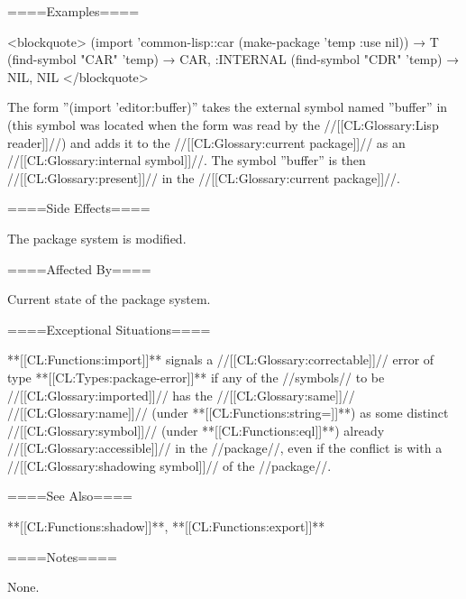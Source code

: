 ====Examples====

<blockquote> (import 'common-lisp::car (make-package 'temp :use nil)) → T (find-symbol "CAR" 'temp) → CAR, :INTERNAL (find-symbol "CDR" 'temp) → NIL, NIL </blockquote>

The form ''(import 'editor:buffer)'' takes the external symbol named ''buffer'' in  (this symbol was located when the form was read by the //[[CL:Glossary:Lisp reader]]//) and adds it to the //[[CL:Glossary:current package]]// as an //[[CL:Glossary:internal symbol]]//. The symbol ''buffer'' is then //[[CL:Glossary:present]]// in the //[[CL:Glossary:current package]]//.

====Side Effects====

The package system is modified.

====Affected By====

Current state of the package system.

====Exceptional Situations====

**[[CL:Functions:import]]** signals a //[[CL:Glossary:correctable]]// error of type **[[CL:Types:package-error]]** if any of the //symbols// to be //[[CL:Glossary:imported]]// has the //[[CL:Glossary:same]]// //[[CL:Glossary:name]]// (under **[[CL:Functions:string=]]**) as some distinct //[[CL:Glossary:symbol]]// (under **[[CL:Functions:eql]]**) already //[[CL:Glossary:accessible]]// in the //package//, even if the conflict is with a //[[CL:Glossary:shadowing symbol]]// of the //package//.

====See Also====

**[[CL:Functions:shadow]]**, **[[CL:Functions:export]]**

====Notes====

None.

 
